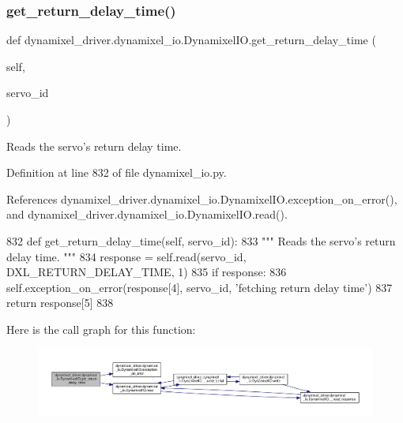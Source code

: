 \subsubsection{\texorpdfstring{get\+\_\+return\+\_\+delay\+\_\+time()}{get\_return\_delay\_time()}}
{\footnotesize\ttfamily def dynamixel\+\_\+driver.\+dynamixel\+\_\+io.\+Dynamixel\+I\+O.\+get\+\_\+return\+\_\+delay\+\_\+time (\begin{DoxyParamCaption}\item[{}]{self,  }\item[{}]{servo\+\_\+id }\end{DoxyParamCaption})}

\begin{DoxyVerb}Reads the servo's return delay time. \end{DoxyVerb}
 

Definition at line 832 of file dynamixel\+\_\+io.\+py.



References dynamixel\+\_\+driver.\+dynamixel\+\_\+io.\+Dynamixel\+I\+O.\+exception\+\_\+on\+\_\+error(), and dynamixel\+\_\+driver.\+dynamixel\+\_\+io.\+Dynamixel\+I\+O.\+read().


\begin{DoxyCode}
832     \textcolor{keyword}{def }get\_return\_delay\_time(self, servo\_id):
833         \textcolor{stringliteral}{""" Reads the servo's return delay time. """}
834         response = self.read(servo\_id, DXL\_RETURN\_DELAY\_TIME, 1)
835         \textcolor{keywordflow}{if} response:
836             self.exception\_on\_error(response[4], servo\_id, \textcolor{stringliteral}{'fetching return delay time'})
837         \textcolor{keywordflow}{return} response[5]
838 
\end{DoxyCode}
Here is the call graph for this function\+:
\nopagebreak
\begin{figure}[H]
\begin{center}
\leavevmode
\includegraphics[width=350pt]{dd/d77/classdynamixel__driver_1_1dynamixel__io_1_1_dynamixel_i_o_a23eb8935d71b71c87fac075d8002abc1_cgraph}
\end{center}
\end{figure}
\mbox{\label{classdynamixel__driver_1_1dynamixel__io_1_1_dynamixel_i_o_abe3496d8e3d3dea89509f354b009b326}} 
